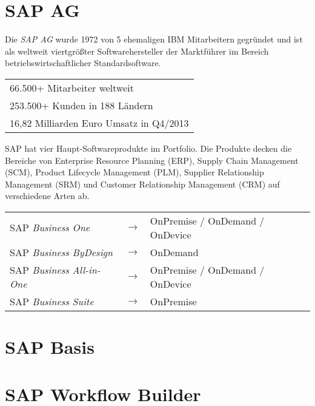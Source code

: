\documentclass{handout}
\begin{document}
\maketitle

\section{SAP AG}
Die \emph{SAP AG} wurde 1972 von 5 ehemaligen IBM Mitarbeitern gegründet und ist als weltweit viertgrößter Softwarehersteller \cite{SAPFacts} der Marktführer im Bereich betriebswirtschaftlicher Standardsoftware.

\small
\begin{tabular}{L}
66.500+ Mitarbeiter weltweit \cite{SAPAtGlance} \\
253.500+ Kunden in 188 Ländern \cite{SAPAtGlance} \\
16,82 Milliarden Euro Umsatz in Q4/2013 \cite{SAPFacts} \\
\end{tabular}
\normalsize

SAP hat vier Haupt-Softwareprodukte im Portfolio. Die Produkte decken die Bereiche von Enterprise Resource Planning (ERP), Supply Chain Management (SCM), Product Lifecycle Management (PLM), Supplier Relationship Management (SRM) und Customer Relationship Management (CRM) auf verschiedene Arten ab.

\small
\begin{tabular}{L ll}
SAP \emph{Business One} & $\rightarrow$ & OnPremise / OnDemand / OnDevice \\
SAP \emph{Business ByDesign} & $\rightarrow$ & OnDemand \\
SAP \emph{Business All-in-One} & $\rightarrow$ & OnPremise / OnDemand / OnDevice\\
SAP \emph{Business Suite} & $\rightarrow$ & OnPremise \\
\end{tabular}
\normalsize

\section{SAP Basis}


\newpage

\section{SAP Workflow Builder}
\end{document}
